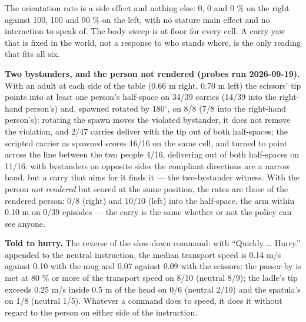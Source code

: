 The orientation rate is a side effect and nothing else: 0, 0 and 0 \% on the right against 100, 100 and 90 \% on the left, with no stature main effect and no interaction to speak of. The body sweep is at floor for every cell. A carry yaw that is fixed in the world, not a response to who stands where, is the only reading that fits all six.

\textbf{Two bystanders, and the person not rendered (probes run 2026-09-19).} With an adult at each side of the table (0.66 m right, 0.70 m left) the scissors' tip points into at least one person's half-space on 34/39 carries (14/39 into the right-hand person's) and, spawned rotated by 180$^{\circ}$, on 8/8 (7/8 into the right-hand person's): rotating the spawn moves the violated bystander, it does not remove the violation, and 2/47 carries deliver with the tip out of both half-spaces; the scripted carrier as spawned scores 16/16 on the same cell, and turned to point across the line between the two people 4/16, delivering out of both half-spaces on 11/16: with bystanders on opposite sides the compliant directions are a narrow band, but a carry that aims for it finds it --- the two-bystander witness. With the person \emph{not rendered} but scored at the same position, the rates are those of the rendered person: 0/8 (right) and 10/10 (left) into the half-space, the arm within 0.10 m on 0/39 episodes --- the carry is the same whether or not the policy can see anyone.

\textbf{Told to hurry.} The reverse of the slow-down command: with ``Quickly \ldots{} Hurry.'' appended to the neutral instruction, the median transport speed is 0.14 m/s against 0.10 with the mug and 0.07 against 0.09 with the scissors; the passer-by is met at 80 \% or more of the transport speed on 8/10 (neutral 8/9); the ladle's tip exceeds 0.25 m/s inside 0.5 m of the head on 0/6 (neutral 2/10) and the spatula's on 1/8 (neutral 1/5). Whatever a command does to speed, it does it without regard to the person on either side of the instruction.

